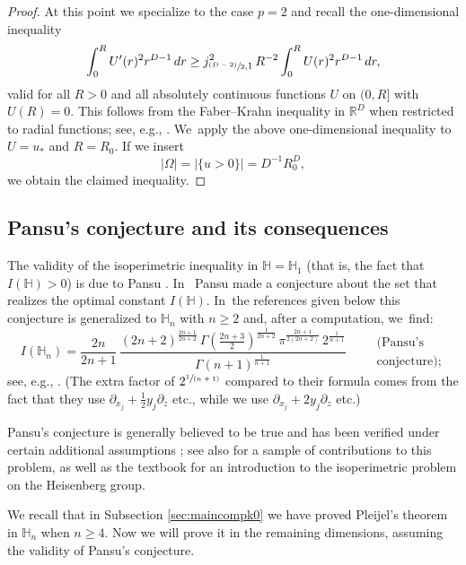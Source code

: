 \documentclass[11pt]{article}
\let\oldsfrac\sfrac
\renewcommand{\sfrac}[2]{{\oldsfrac{#1}{#2}}}
\newcommand{\psfrac}[2]{{\sfrac{(#1)}{#2}}}
\newcommand{\spfrac}[2]{{\sfrac{#1}{(#2)}}}
\theoremstyle{definition}
\newcommand{\1}{\mathbbm{1}}
\newcommand{\R}{\mathbb{R}}
\numberwithin{equation}{section}
\begin{document}
\begin{proof}
At this point we specialize to the case $p=2$ and recall the one-dimensional inequality
\[
\int_0^R U'(r)^2 r^{D-1}\,dr \geq j_{\psfrac{D-2}{2},1}^2 \,R^{-2} \int_0^R U(r)^2 r^{D-1}\,dr,
\]
valid for all $R>0$ and all absolutely continuous functions $U$ on $(0,R]$ with \hbox{$U(R)=0$}. This follows from the Faber--Krahn inequality in $\R^D$ when restricted to radial functions; see, e.g., \cite[Th.\,2.54]{FLW}. We~apply the above one-dimensional inequality to $U=u_*$ and $R=R_0$. If we insert
\[
|\Omega| = |\{ u>0\}| = D^{-1} R_0^D,
\]
we obtain the claimed inequality.
\end{proof}

\subsection{Pansu's conjecture and its consequences}
The validity of the isoperimetric inequality in $\mathbb H=\mathbb H_1$ (that is, the fact that $I(\mathbb H)>0$) is due to Pansu \cite{Pa}. In~\cite{Pa2} Pansu made a conjecture about the set that realizes the optimal constant $I(\mathbb H)$. In~the references given below this conjecture is generalized to $\mathbb H_n$ with $n\geq 2$ and, after a computation, we~find:
\begin{equation}
\label{eq:pansusconj}
I(\mathbb H_n) = \frac{2n}{2n+1} \,\frac{(2n+2)^{\frac{2n+1}{2n+2}} \,\Gamma(\tfrac{2n+3}{2})^\frac 1{2n+2}\, \pi^\frac{2n+1}{2(2n+2)}\, 2^\frac 1{n+1}}{\Gamma(n+1)^\frac 1{n+1}} \qquad\begin{array}{l} \text{(Pansu's}\\\text{conjecture);}\end{array}
\end{equation}
see, e.g., \cite{DGN2}. (The extra factor of $2^\spfrac1{n+1}$ compared to their formula comes from the fact that they use $\partial_{x_j} +\frac12 y_j\partial_z$ etc., while we use $\partial_{x_j} + 2y_j\partial_z$ etc.)

Pansu's conjecture is generally believed to be true and has been verified under certain additional assumptions \cite{RR,DGN2,RR2,Ri,Mon,MoRi}; see also \cite{LeRi,LeMa,ChChHwYa,ChHwMaYa} for a sample of contributions to this problem, as well as the textbook \cite{CaDaPaTy} for an introduction to the isoperimetric problem on the Heisenberg group.

We recall that in Subsection \ref{sec:maincompk0} we have proved Pleijel's theorem in $\mathbb H_n$ when $n\geq 4$. Now we will prove it in the remaining dimensions, assuming the validity of Pansu's conjecture.
\end{document}
